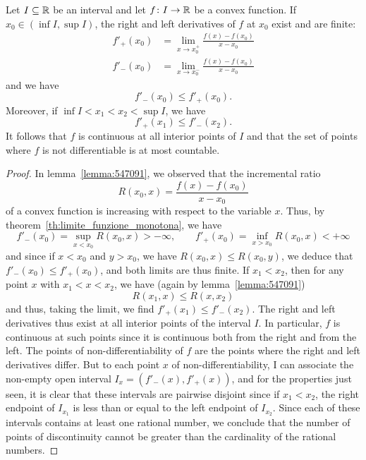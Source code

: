 \begin{theorem}
    Let $I\subseteq {\mathbb R}$ be an interval and let $f\colon I \to {\mathbb R}$ be a convex
  function.
    If $x_0\in (\inf I, \sup I)$, the right and left derivatives of $f$ at $x_0$
  exist and are finite:
  \begin{align*}
    f'_+(x_0) &= \lim_{x\to x_0^+} \frac{f(x)-f(x_0)}{x-x_0}\\
    f'_-(x_0)  &= \lim_{x\to x_0^-} \frac{f(x)-f(x_0)}{x-x_0}  
  \end{align*}
  and we have
  \[
    f'_-(x_0) \le f'_+(x_0).
  \]
  Moreover, if $\inf I < x_1 < x_2 < \sup I$, we have 
  \[
    f'_+(x_1) \le f'_-(x_2).
  \]
  It follows that $f$ is continuous at all interior points of $I$ 
  and that the set of points where $f$ is not differentiable 
  is at most countable.
  \end{theorem}
  \begin{proof}
    In lemma~\ref{lemma:547091}, we observed that the incremental ratio
    \[
      R(x_0,x) = \frac{f(x)-f(x_0)}{x-x_0}
    \] 
    of a convex function is increasing with respect to the variable $x$. 
    Thus, by theorem~\ref{th:limite_funzione_monotona}, we 
    have 
    \[
      f'_-(x_0) = \sup_{x<x_0} R(x_0,x)>-\infty, \qquad 
      f'_+(x_0) = \inf_{x>x_0} R(x_0,x)<+\infty
    \]
    and since if $x<x_0$ and $y>x_0$, we have $R(x_0,x)\le R(x_0,y)$, 
    we deduce that $f'_-(x_0)\le f'_+(x_0)$, and both limits 
    are thus finite. If $x_1 < x_2$, then for any 
    point $x$ with $x_1<x<x_2$, we have (again by lemma~\ref{lemma:547091})
    \[
      R(x_1,x) \le R(x,x_2)
    \]
    and thus, taking the limit, we find $f'_+(x_1) \le f'_-(x_2)$.
    The right and left derivatives thus exist at all interior points 
    of the interval $I$. 
        In particular, $f$ is continuous at such points since it is continuous
    both from the right
    and from the left.
    The points of non-differentiability of $f$ are the points where 
    the right and left derivatives differ. 
    But to each point $x$ of non-differentiability, 
        I can associate the non-empty open interval $I_x = (f'_-(x),f'_+(x))$,
    and for
        the properties just seen, it is clear that these intervals are pairwise
    disjoint
        since if $x_1<x_2$, the right endpoint of $I_{x_1}$ is less than or
    equal to the left endpoint
    of $I_{x_2}$.
        Since each of these intervals contains at least one rational number, we
    conclude that
        the number of points of discontinuity cannot be greater than the
    cardinality
    of the rational numbers.
  \end{proof}
  
